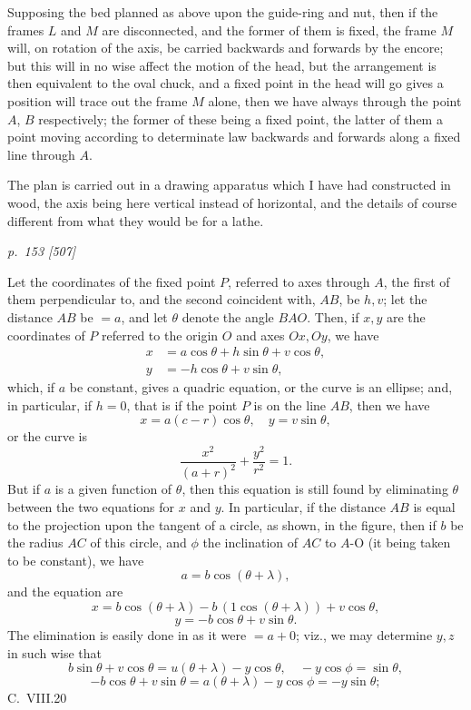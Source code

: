 \documentclass[11pt,a4paper]{book}
\begin{document}
Supposing the bed planned as above upon the guide-ring and nut, then if the
frames $L$ and $M$ are disconnected, and the former of them is fixed, the frame $M$ will,
on rotation of the axis, be carried backwards and forwards by the encore; but this
will in no wise affect the motion of the head, but the arrangement is then equivalent to
the oval chuck, and a fixed point in the head will go gives a position will trace
out the frame $M$ alone, then we have always through the point $A$, $B$ respectively; the
former of these being a fixed point, the latter of them a point moving according to
determinate law backwards and forwards along a fixed line through $A$.

The plan is carried out in a drawing apparatus which I have had constructed
in wood, the axis being here vertical instead of horizontal, and the details of course
different from what they would be for a lathe.

\clearpage

\bigskip
\textit{p.~153 [507]}
\smallskip

\noindent
Let the coordinates of the fixed point $P$, referred to axes through $A$, the first of
them perpendicular to, and the second coincident with, $AB$, be $h, v$; let the distance
$AB$ be $= a$, and let $\theta$ denote the angle $BAO$. Then, if $x, y$ are the coordinates of
$P$ referred to the origin $O$ and axes $Ox, Oy$, we have
\begin{align*}
x &= a\cos\theta + h\sin\theta + v\cos\theta,\\
y &= -h\cos\theta + v\sin\theta,
\end{align*}
which, if $a$ be constant, gives a quadric equation, or the curve is an ellipse; and, in
particular, if $h = 0$, that is if the point $P$ is on the line $AB$, then we have
\[
x = a(c - r)\cos\theta,\quad y = v\sin\theta,
\]
or the curve is
\[
\frac{x^2}{(a + r)^2} + \frac{y^2}{r^2} = 1.
\]
But if $a$ is a given function of $\theta$, then this equation is still found by eliminating
$\theta$ between the two equations for $x$ and $y$. In particular, if the distance $AB$ is equal
to the projection upon the tangent of a circle, as shown, in the figure, then if $b$
be the radius $AC$ of this circle, and $\phi$ the inclination of $AC$ to $A$-O (it being
taken to be constant), we have
\[
a = b\cos(\theta + \lambda),
\]
and the equation are
\[
x = b\cos(\theta + \lambda) - b\,(1\cos(\theta + \lambda)) + v\cos\theta,
\]
\[
y = -b\cos\theta + v\sin\theta.
\]
The elimination is easily done in as it were $= a + 0$; viz., we may determine $y, z$ in
such wise that
\[
b\sin\theta + v\cos\theta = u(\theta + \lambda) - y\cos\theta,\quad - y\cos\phi = \sin\theta,
\]
\[
-b\cos\theta + v\sin\theta = a(\theta + \lambda) - y\cos\phi = -y\sin\theta;
\]
\hfill C.\ VIII.\hfill 20
\end{document}
